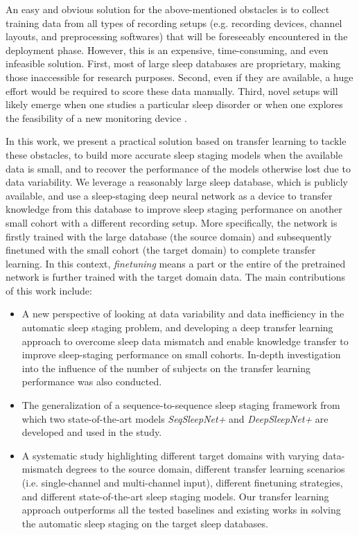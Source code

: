 \documentclass[journal,twoside,web]{ieeecolor}
\begin{document}
An easy and obvious solution for the above-mentioned obstacles is to collect training data from all types of recording setups (e.g. recording devices, channel layouts, and preprocessing softwares) that will be foreseeably encountered in the deployment phase. However, this is an expensive, time-consuming, and even infeasible solution. First, most of large sleep databases are proprietary, making those inaccessible for research purposes. Second, even if they are available, a huge effort would be required to score these data manually. Third, novel setups will likely emerge when one studies a particular sleep disorder \cite{Cooray2019,Andreotti2018} or when one explores the feasibility of a new monitoring device \cite{Mikkelsen2019}.

In this work, we present a practical solution based on transfer learning to tackle these obstacles, to build more accurate sleep staging models when the available data is small, and to recover the performance of the models otherwise lost due to data variability. We leverage a reasonably large sleep database, which is publicly available, and use a sleep-staging deep neural network as a device to transfer knowledge from this database to improve sleep staging performance on another small cohort with a different recording setup. More specifically, the network is firstly trained with the large database (the source domain) and subsequently finetuned with the small cohort (the target domain) to complete transfer learning. In this context, \emph{finetuning} means a part or the entire of the pretrained network is further trained with the target domain data. The main contributions of this work include:
\begin{itemize}
	\item A new perspective of looking at data variability and data inefficiency in the automatic sleep staging problem, and developing a deep transfer learning approach to overcome sleep data mismatch and enable knowledge transfer to improve sleep-staging performance on small cohorts. In-depth investigation into the influence of the number of subjects on the transfer learning performance was also conducted.
	\item The generalization of a sequence-to-sequence sleep staging framework from which two state-of-the-art models \emph{SeqSleepNet+} and \emph{DeepSleepNet+} are developed and used in the study.
	\item A systematic study highlighting different target domains with varying data-mismatch degrees to the source domain, different transfer learning scenarios (i.e. single-channel and multi-channel input), different finetuning strategies, and different state-of-the-art sleep staging models. Our transfer learning approach outperforms all the tested baselines and existing works in solving the automatic sleep staging  on the target sleep databases.
\end{itemize}
\end{document}

